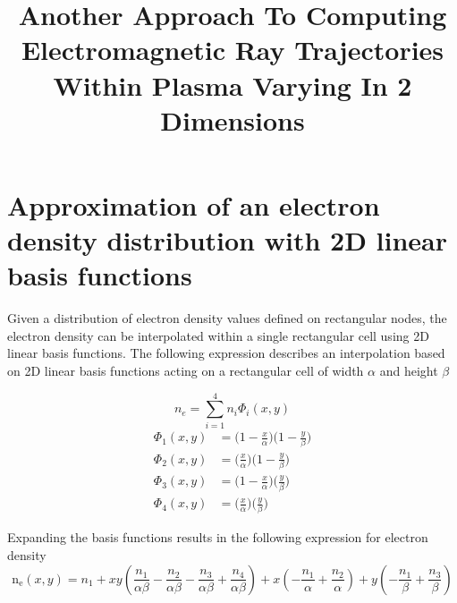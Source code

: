 \documentclass[11pt]{article}
\title{Another Approach To Computing Electromagnetic Ray Trajectories Within Plasma Varying In 2 Dimensions}
\date{}
\begin{document}
\maketitle
\section*{Approximation of an electron density distribution with 2D linear basis functions}
Given a distribution of electron density values defined on rectangular nodes, the electron density can be interpolated within a single rectangular cell using 2D linear basis functions. The following expression describes an interpolation based on 2D linear basis functions acting on a rectangular cell of width $\alpha$ and height $\beta$
\newline


\begin{equation}
n_e = \sum^4_{i=1}{n_{i}\Phi_i(x,y)}
\end{equation}
\begin{align}
\Phi_1(x,y) &= \bigg(1-\frac{x}{\alpha}\bigg)\bigg(1-\frac{y}{\beta}\bigg) \tag{2a}\\
\Phi_2(x,y) &= \bigg(\frac{x}{\alpha}\bigg)\bigg(1-\frac{y}{\beta}\bigg) \tag{2b}\\
\Phi_3(x,y) &= \bigg(1-\frac{x}{\alpha}\bigg)\bigg(\frac{y}{\beta}\bigg) \tag{2c}\\
\Phi_4(x,y) &= \bigg(\frac{x}{\alpha}\bigg)\bigg(\frac{y}{\beta}\bigg) \tag{2d}
\end{align}

Expanding the basis functions results in the following expression for electron density
\begin{equation*}
\operatorname{n_{e}}{\left(x,y \right)} = n_{1} + x y \left(\frac{n_{1}}{\alpha \beta} - \frac{n_{2}}{\alpha \beta} - \frac{n_{3}}{\alpha \beta} + \frac{n_{4}}{\alpha \beta}\right) + x \left(- \frac{n_{1}}{\alpha} + \frac{n_{2}}{\alpha}\right) + y \left(- \frac{n_{1}}{\beta} + \frac{n_{3}}{\beta}\right)
\end{equation*}
\end{document}
